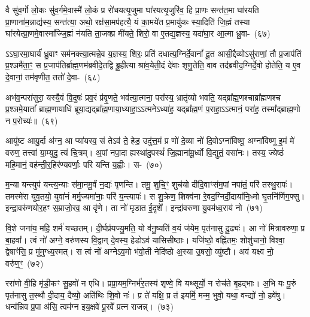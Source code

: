 वै सु॑व॒र्गो लो॒कः सु॑व॒र्गमे॒वास्मै॑ लो॒कं प्र रो॑चयत्यृ॒जुमा घा॑रयत्यृ॒जुरि॑व॒ हि प्रा॒णः सन्त॑त॒मा घा॑रयति प्रा॒णाना॑म॒न्नाद्य॑स्य॒ सन्त॑त्या॒ अथो॒ रक्ष॑सा॒मप॑हत्यै॒ यं का॒मये॑त प्र॒मायु॑कः स्या॒दिति॑ जि॒ह्मं तस्या घा॑रयेत्प्रा॒णमे॒वास्मा᳚ज्जि॒ह्मं न॑यति ता॒जक्प्र मी॑यते॒ शिरो॒ वा ए॒तद्य॒ज्ञस्य॒ यदा॑घा॒र आ॒त्मा ध्रु॒वा-~(६७)

ऽऽघा॒रमा॒घार्य॑ ध्रु॒वाꣳ सम॑नक्त्या॒त्मन्ने॒व य॒ज्ञस्य॒ शिरः॒ प्रति॑ दधा\-त्य॒\-ग्निर्दे॒वानां᳚ दू॒त आसी॒द्दैव्यो\-ऽसु॑राणां॒ तौ प्र॒जा\-प॑तिं प्र॒श्ञमै॑ता॒ꣳ॒ स प्र॒जा\-प॑तिर्ब्राह्म॒णम॑ब्रवीदे॒तद्वि ब्रू॒हीत्या श्रा॑व॒येती॒दं दे॑वाः शृणु॒तेति॒ वाव तद॑ब्रवीद॒ग्निर्दे॒वो होतेति॒ य ए॒व दे॒वानां॒ तम॑वृणीत॒ ततो॑ \mbox{दे॒वा-~(६८)}

अभ॑व॒न्परा॑सुरा॒ यस्यै॒वं वि॒दुषः॑ प्रव॒रं प्र॑वृ॒णते॒ भव॑त्या॒त्मना॒ परा᳚स्य॒ भ्रातृ॑व्यो भवति॒ यद्ब्रा᳚ह्म॒णश्चाब्रा᳚ह्मणश्च प्र॒श्ञमे॒यातां᳚ ब्राह्म॒णायाधि॑ ब्रूया॒द्यद्ब्रा᳚ह्म॒णाया॒ध्याहा॒ऽऽत्मने\-ऽध्या॑ह॒ यद्ब्रा᳚ह्म॒णं प॒राहा॒ऽऽत्मानं॒ परा॑ह॒ तस्मा᳚द्ब्राह्म॒णो न प॒रोच्यः॑॥~(६९)

{\anuvakamend[{वा आ॑र॒ण्याꣴश्चाव॑ रु॒न्धे\-ऽथो॑ प॒शुभिः॒ सो᳚\-ऽब्रवीद्दक्षिणा॒र्ध्य॑न्त्रय॑ इव ध्रु॒वा दे॒वाश्च॑त्वारि॒ꣳ॒शच्च॑}]}%

आयु॑ष्ट आयु॒र्दा अ॑ग्न॒ आ प्या॑यस्व॒ सं ते\-ऽव॑ ते॒ हेड॒ उदु॑त्त॒मं प्र णो॑ दे॒व्या नो॑ दि॒वो\-ऽग्ना॑विष्णू॒ अग्ना॑विष्णू इ॒मं मे॑ वरुण॒ तत्त्वा॑ या॒म्युदु॒ त्यं चि॒त्रम्। अ॒पां नपा॒दा ह्यस्था॑दु॒पस्थं॑ जि॒ह्माना॑मू॒र्ध्वो वि॒द्युतं॒ वसा॑नः। तस्य॒ ज्येष्ठं॑ महि॒मानं॒ वह॑न्ती॒र्॒\mbox{}हिर॑ण्यवर्णाः॒ परि॑ यन्ति य॒ह्वीः। स-~(७०)

म॒न्या यन्त्युप॑ यन्त्य॒न्याः स॑मा॒नमू॒र्वं न॒द्यः॑ पृणन्ति। तमू॒ शुचि॒ꣳ॒ शुच॑यो दीदि॒वाꣳस॑म॒पां नपा॑तं॒ परि॑ तस्थु॒रापः॑। तमस्मे॑रा युव॒तयो॒ युवा॑नं मर्मृ॒ज्यमा॑नाः॒ परि॑ य॒न्त्यापः॑। स शु॒क्रेण॒ शिक्व॑ना रे॒वद॒ग्निर्दी॒दाया॑नि॒ध्मो घृ॒तनि॑र्णिग॒फ्सु। इन्द्रा॒वरु॑णयोर॒हꣳ स॒म्राजो॒रव॒ आ वृ॑णे। ता नो॑ मृडात ई॒दृशे᳚। इन्द्रा॑वरुणा यु॒वम॑ध्व॒राय॑ नो~(७१)

वि॒शे जना॑य॒ महि॒ शर्म॑ यच्छतम्। दी॒र्घप्र॑यज्यु॒मति॒ यो व॑नु॒ष्यति॑ व॒यं ज॑येम॒ पृत॑नासु दू॒ढ्यः॑। आ नो॑ मित्रावरुणा॒ प्र बा॒हवा᳚। त्वं नो॑ अग्ने॒ वरु॑णस्य वि॒द्वान् दे॒वस्य॒ हेडो\-ऽव॑ यासिसीष्ठाः। यजि॑ष्ठो॒ वह्नि॑तमः॒ शोशु॑चानो॒ विश्वा॒ द्वेषाꣳ॑सि॒ प्र मु॑मुग्ध्य॒स्मत्। स त्वं नो॑ अग्ने\-ऽव॒मो भ॑वो॒ती नेदि॑ष्ठो अ॒स्या उ॒षसो॒ व्यु॑ष्टौ। अव॑ यक्ष्व नो॒ वरु॑ण॒ꣳ॒~(७२)

ररा॑णो वी॒हि मृ॑डी॒कꣳ सु॒हवो॑ न एधि। प्रप्रा॒यम॒ग्निर्भ॑र॒तस्य॑ शृण्वे॒ वि यथ्सूर्यो॒ न रोच॑ते बृ॒हद्भाः। अ॒भि यः पू॒रुं पृत॑नासु त॒स्थौ दी॒दाय॒ दैव्यो॒ अति॑थिः शि॒वो नः॑। प्र ते॑ यक्षि॒ प्र त॑ इयर्मि॒ मन्म॒ भुवो॒ यथा॒ वन्द्यो॑ नो॒ हवे॑षु। धन्व॑न्निव प्र॒पा अ॑सि॒ त्वम॑ग्न इय॒क्षवे॑ पू॒रवे᳚ प्रत्न राजन्न्।~(७३)

